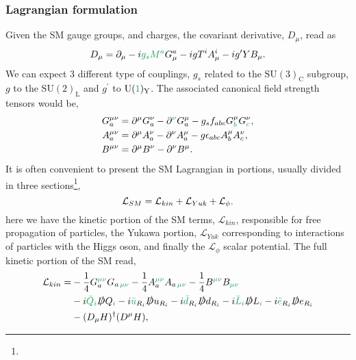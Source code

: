 \subsubsection{Lagrangian formulation }
%
Given the SM gauge groups,  and charges,  the covariant derivative, $D_\mu$,  read as
%
\begin{equation}
\label{eq:PartialDefSM}
D_\mu = \partial_\mu - i \Joaoadd{g_s} \Joaoadd{M^a} G^a_\mu - i g T^i A^i_\mu - i g' Y B_\mu.
\end{equation}  
%
 We can expect 3 different type of couplings, $g_s$ related to the $\mathrm{SU(3)_C}$ subgroup, $g$ to the $\mathrm{SU(2)_L}$ and $g^\prime$ to $\mathrm{U(\Joaoadd{1})_Y}$. The associated canonical field strength tensors would be,
\begin{equation}\label{eq:Field_strength_tensors}
\begin{aligned}
G_a^{\mu \nu} & = \partial^\mu G^\nu_a - \partial^{\Joaoadd{\nu}} G^\mu_a - g_s f_{abc} G_{\Joaoadd{b}}^\mu G_{\Joaoadd{c}}^\nu,  \\ 
A_a^{\mu \nu} & = \partial^\mu A^\nu_a - \partial^\nu A^\mu_a  - g \epsilon_{abc} A^\mu_b A^\nu_c, \\
B^{\mu \nu}   & = \partial^\mu B^\nu - \partial^\nu B^\mu.
\end{aligned}
\end{equation}
It is often convenient to present the SM Lagrangian in portions, usually divided in three sections\footnote{},
\begin{equation}\label{eq:SM_baby_lagrangian}
\mathcal{L}_{SM} = \mathcal{L}_{kin}  +  \mathcal{L}_{Yuk} +  \mathcal{L}_{\phi}\Joaoadd{,}
\end{equation}
here we have the kinetic portion of the SM terms, $\mathcal{L}_{kin}$, responsible for  free propagation of particles, the Yukawa portion, $\mathcal{L}_{Yuk}$  corresponding to interactions of particles with the Higgs oson, and finally the $\mathcal{L}_{\phi}$ scalar potential. The full kinetic portion of the SM read, 
%
\begin{equation}\label{eq:KinSM}
\begin{aligned}
\mathcal{L}_{kin} = & - \frac{1}{4} G^{\Joaoadd{\mu\nu}}_a G_{a \,\Joaoadd{\mu\nu}}  - \frac{1}{4}  A^{\Joaoadd{\mu\nu}}_a A_{a \,\Joaoadd{\mu\nu}}  
- \frac{1}{4}  B^{\Joaoadd{\mu\nu}} B_{\Joaoadd{\mu\nu}}  \\ 
& -i \Joaoadd{\bar{Q}}_{\Joaoadd{i}} \slashed{D} Q_{\Joaoadd{i}} 
-i \Joaoadd{\bar{u}}_{R_i} \slashed{D} u_{R_i}  
-i \Joaoadd{\bar{d}}_{R_i} \slashed{D} d_{R_i}  
-i \Joaoadd{\bar{L}}_{\Joaoadd{i}} \slashed{D} L_{\Joaoadd{i}}    
-i \Joaoadd{\bar{e}}_{R_i} \slashed{D} e_{R_i}   \\
& - (D_\mu H)^\dagger ( D^\mu H ),    
\end{aligned}
\end{equation}
